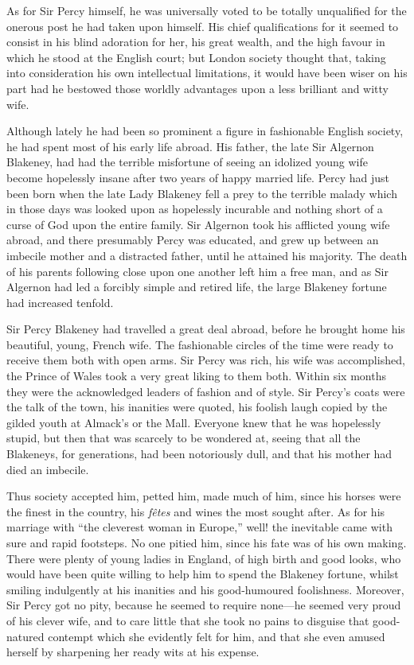 \documentclass[paper=5.5in:8.5in,BCOR=7mm,twoside,DIV=calc,12pt,usegeometry,chapterprefix,endperiod,headings=big]{scrbook}
\begin{document}
As for Sir Percy himself, he was universally voted to be totally unqualified for the onerous post he had taken upon himself. His chief qualifications for it seemed to consist in his blind adoration for her, his great wealth, and the high favour in which he stood at the English court; but London society thought that, taking into consideration his own intellectual limitations, it would have been wiser on his part had he bestowed those worldly advantages upon a less brilliant and witty wife.

Although lately he had been so prominent a figure in fashionable English society, he had spent most of his early life abroad. His father, the late Sir Algernon Blakeney, had had the terrible misfortune of seeing an idolized young wife become hopelessly insane after two years of happy married life. Percy had just been born when the late Lady Blakeney fell a prey to the terrible malady which in those days was looked upon as hopelessly incurable and nothing short of a curse of God upon the entire family. Sir Algernon took his afflicted young wife abroad, and there presumably Percy was educated, and grew up between an imbecile mother and a distracted father, until he attained his majority. The death of his parents following close upon one another left him a free man, and as Sir Algernon had led a forcibly simple and retired life, the large Blakeney fortune had increased tenfold.

Sir Percy Blakeney had travelled a great deal abroad, before he brought home his beautiful, young, French wife. The fashionable circles of the time were ready to receive them both with open arms. Sir Percy was rich, his wife was accomplished, the Prince of Wales took a very great liking to them both. Within six months they were the acknowledged leaders of fashion and of style. Sir Percy's coats were the talk of the town, his inanities were quoted, his foolish laugh copied by the gilded youth at Almack's or the Mall. Everyone knew that he was hopelessly stupid, but then that was scarcely to be wondered at, seeing that all the Blakeneys, for generations, had been notoriously dull, and that his mother had died an imbecile.

Thus society accepted him, petted him, made much of him, since his horses were the finest in the country, his \textit{fêtes} and wines the most sought after. As for his marriage with \enquote{the cleverest woman in Europe,} well! the inevitable came with sure and rapid footsteps. No one pitied him, since his fate was of his own making. There were plenty of young ladies in England, of high birth and good looks, who would have been quite willing to help him to spend the Blakeney fortune, whilst smiling indulgently at his inanities and his good-humoured foolishness. Moreover, Sir Percy got no pity, because he seemed to require none---he seemed very proud of his clever wife, and to care little that she took no pains to disguise that good-natured contempt which she evidently felt for him, and that she even amused herself by sharpening her ready wits at his expense.
\end{document}

